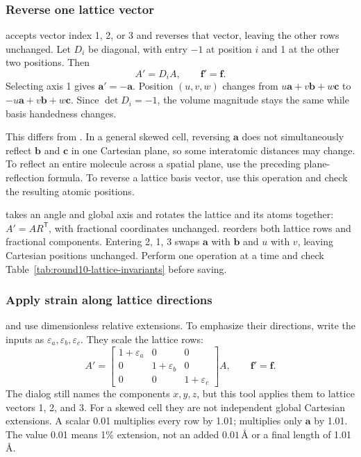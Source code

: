 \subsubsection{Reverse one lattice vector}

 accepts vector index 1, 2, or 3 and reverses that vector, leaving the other rows unchanged. Let $D_i$ be diagonal, with entry $-1$ at position $i$ and 1 at the other two positions. Then
\begin{equation}
 A'=D_iA,\qquad \mathbf f'=\mathbf f.
 \label{eq:mirror-lattice-row}
\end{equation}
Selecting axis 1 gives $\mathbf a'=-\mathbf a$. Position $(u,v,w)$ changes from $u\mathbf a+v\mathbf b+w\mathbf c$ to $-u\mathbf a+v\mathbf b+w\mathbf c$. Since $\det D_i=-1$, the volume magnitude stays the same while basis handedness changes.

This differs from . In a general skewed cell, reversing $\mathbf a$ does not simultaneously reflect $\mathbf b$ and $\mathbf c$ in one Cartesian plane, so some interatomic distances may change. To reflect an entire molecule across a spatial plane, use the preceding plane-reflection formula. To reverse a lattice basis vector, use this operation and check the resulting atomic positions.

 takes an angle and global axis and rotates the lattice and its atoms together: $A'=AR^{\mathsf T}$, with fractional coordinates unchanged.  reorders both lattice rows and fractional components. Entering 2, 1, 3 swaps $\mathbf a$ with $\mathbf b$ and $u$ with $v$, leaving Cartesian positions unchanged. Perform one operation at a time and check Table~\ref{tab:round10-lattice-invariants} before saving.

\subsubsection{Apply strain along lattice directions}

 and  use dimensionless relative extensions. To emphasize their directions, write the inputs as $\varepsilon_a,\varepsilon_b,\varepsilon_c$. They scale the lattice rows:
\begin{equation}
 A'=\begin{bmatrix}
 1+\varepsilon_a&0&0\\
 0&1+\varepsilon_b&0\\
 0&0&1+\varepsilon_c
 \end{bmatrix}A,\qquad \mathbf f'=\mathbf f.
 \label{eq:lattice-axial-strain}
\end{equation}
The dialog still names the components $x,y,z$, but this tool applies them to lattice vectors 1, 2, and 3. For a skewed cell they are not independent global Cartesian extensions. A scalar 0.01 multiplies every row by 1.01;  multiplies only $\mathbf a$ by 1.01. The value 0.01 means 1\% extension, not an added $0.01\,\text{\AA}$ or a final length of 1.01\,\AA.

